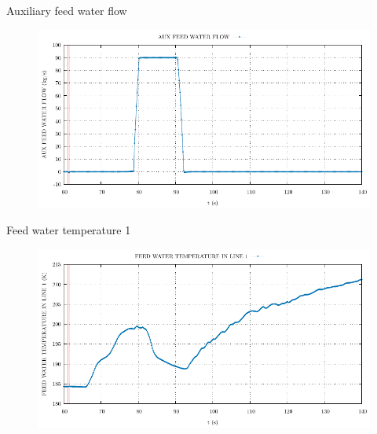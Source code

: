 \begin{frame}{Auxiliary feed water flow}
	\begin{figure}
		\centering
		\includegraphics[width=\textwidth]{./02SteamLineBreak/graphs/AUX FEED WATER FLOW.pdf}
		
	\end{figure}
	
\end{frame}


\begin{frame}{Feed water temperature 1}
	\begin{figure}
		\centering
		\includegraphics[width=\textwidth]{./02SteamLineBreak/graphs/FEED WATER TEMPERATURE IN LINE 1.pdf}
		
	\end{figure}
	
\end{frame}


